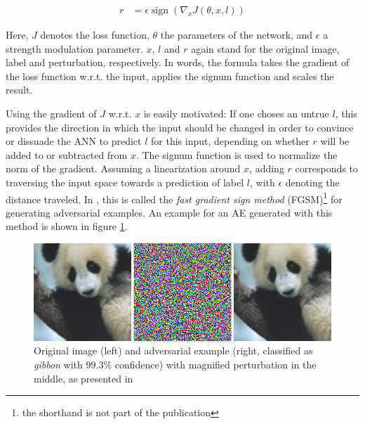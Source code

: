 \documentclass[11pt, a4paper]{article}
\newcommand\braces[1]{\left(#1\right)}
\DeclareMathOperator{\sign}{sign}
\begin{document}
\begin{align}
	r &= \epsilon \sign \braces{\nabla_x J\braces{\theta, x, l}} \label{eq:fast-gradient-sign-method}
\end{align}

Here, $J$ denotes the loss function, $\theta$ the parameters of the network, and $\epsilon$ a strength modulation parameter. $x$, $l$ and $r$ again stand for the original image, label and perturbation, respectively. In words, the formula takes the gradient of the loss function w.r.t. the input, applies the signum function and scales the result.

Using the gradient of $J$ w.r.t. $x$ is easily motivated: If one choses an untrue $l$, this provides the direction in which the input should be changed in order to convince or dissuade the ANN to predict $l$ for this input, depending on whether $r$ will be added to or subtracted from $x$. The signum function is used to normalize the norm of the gradient. Assuming a linearization around $x$, adding $r$ corresponds to traversing the input space towards a prediction of label $l$, with $\epsilon$ denoting the distance traveled. In \cite{explaining-and-harnessing-adversarial-examples}, this is called the \emph{fast gradient sign method} (FGSM)\footnote{the shorthand is not part of the publication} for generating adversarial examples. An example for an AE generated with this method is shown in figure \ref{fig:harnessing-ae}.

\begin{figure}[htp]
	\centering
	\includegraphics[width=\textwidth]{images/harnessing_ae.png}
	\caption{Original image (left) and adversarial example (right, classified as \emph{gibbon} with $99.3\%$ confidence) with magnified perturbation in the middle, as presented in \cite{explaining-and-harnessing-adversarial-examples}}
	\label{fig:harnessing-ae}
\end{figure}


\end{document}

